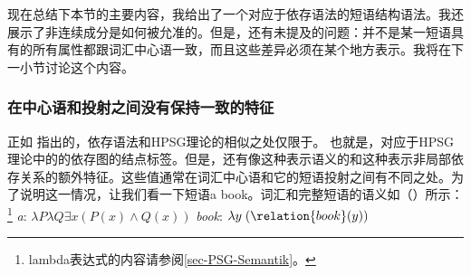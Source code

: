 现在总结下本节的主要内容，我给出了一个对应于依存语法的短语结构语法。我还展示了非连续成分是如何被允准的。但是，还有未提及的问题：并不是某一短语具有的所有属性都跟词汇中心语一致，而且这些差异必须在某个地方表示。我将在下一小节讨论这个内容。

\subsubsection{在中心语和投射之间没有保持一致的特征}
\label{sec-dg-daughters-mothers}
\label{sec-dg-is-simpler}
%
正如 \citet{Oliva2003a}指出的，依存语法和HPSG理论的相似之处仅限于\headvsc。
也就是，对应于HPSG理论中的\headvsc 的依存图的结点标签。但是，还有像\contc 这种表示语义的和\slaschc 这种表示非局部依存关系的额外特征。这些值通常在词汇中心语和它的短语投射之间有不同之处。为了说明这一情况，让我们看一下短语a book。词汇和完整短语的语义如（）所示：\footnote{lambda表达式的内容请参阅\ref{sec-PSG-Semantik}。}
\eal
\ex \emph{a}: $\lambda P \lambda Q \exists x (P(x) \wedge Q(x))$
\ex \emph{book}: $\lambda y\;(\relation{book}(y))$
